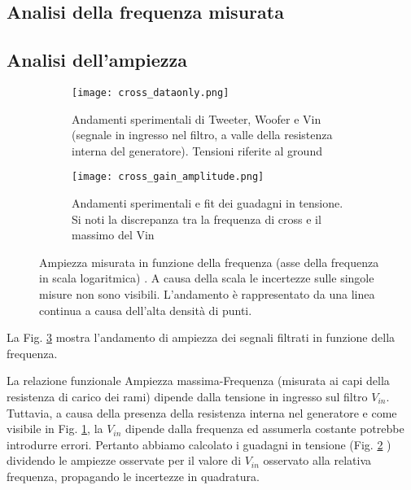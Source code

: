 \documentclass[../Relazione_circuiti]{subfiles}
\begin{document}
\subsection{Analisi della frequenza misurata}

\subsection{Analisi dell'ampiezza}

  \begin{figure}[H]
    \centering

    \begin{subfigure}[t]{=0.49\textwidth}

      \texttt{[image: cross\_dataonly.png]}

      \caption{Andamenti sperimentali di Tweeter, Woofer e Vin (segnale in ingresso nel filtro,
        a valle della resistenza interna del generatore). Tensioni riferite al ground}
      \label{fig: amplitude_dataonly}

    \end{subfigure}
    \hfill
    \begin{subfigure}[t]{=0.49\textwidth}

      \texttt{[image: cross\_gain\_amplitude.png]}

      \caption
      {Andamenti sperimentali e fit dei guadagni in tensione. Si noti la discrepanza tra la frequenza di cross e il
      massimo del Vin}
      \label{fig:cross_gain}
    \end{subfigure}

    \caption{Ampiezza misurata in funzione della frequenza (asse della frequenza in scala logaritmica)
      . A causa della scala le incertezze sulle singole misure non sono visibili. L'andamento è rappresentato da una
      linea continua a causa dell'alta densità di punti.}
    \label{fig:cross_amplitude}

  \end{figure}

  La Fig. \ref{fig:cross_amplitude} mostra l'andamento di ampiezza dei segnali filtrati in funzione della frequenza.

  La relazione funzionale Ampiezza massima-Frequenza (misurata ai capi della resistenza di carico dei rami) dipende
  dalla tensione in ingresso sul filtro $V_{in}$.
  Tuttavia, a causa della presenza della resistenza interna nel generatore e come visibile in Fig.
  \ref{fig: amplitude_dataonly}, la $V_{in}$
  dipende dalla frequenza ed assumerla costante potrebbe introdurre errori.
  Pertanto abbiamo calcolato i guadagni in tensione (Fig. \ref{fig:cross_gain}
  ) dividendo le ampiezze osservate per il valore di $V_{in}$
  osservato alla relativa frequenza, propagando le incertezze in quadratura.
\end{document}
